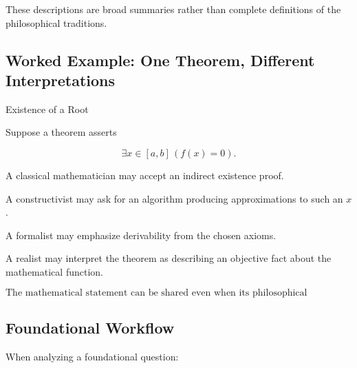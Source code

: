 These descriptions are broad summaries rather than complete definitions of
the philosophical traditions.

\subsection{Worked Example: One Theorem, Different Interpretations}
\label{subsec:worked-different-foundations}

\begin{workedexamplebox}{Existence of a Root}

Suppose a theorem asserts

\[
\exists x\in[a,b]
\,
(f(x)=0).
\]

A classical mathematician may accept an indirect existence proof.

A constructivist may ask for an algorithm producing approximations to such
an \(x\).

A formalist may emphasize derivability from the chosen axioms.

A realist may interpret the theorem as describing an objective fact about
the mathematical function.

\begin{answerbox}
\[
\boxed{
\text{The mathematical statement can be shared even when its philosophical
interpretation differs.}
}
\]
\end{answerbox}

\end{workedexamplebox}

\subsection{Foundational Workflow}
\label{subsec:foundational-workflow}

When analyzing a foundational question:

